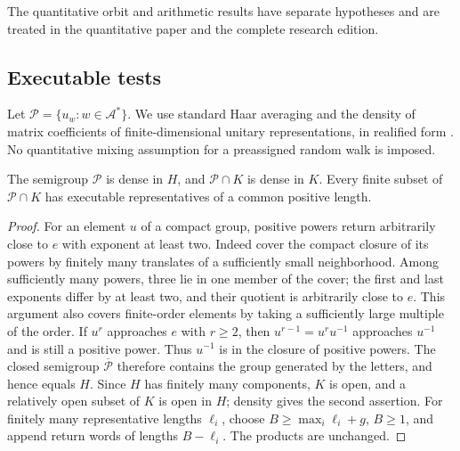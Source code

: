 The quantitative orbit and arithmetic results have separate hypotheses and are treated in the quantitative paper and the complete research edition.

\subsection{Executable tests}
Let $\mathcal P=\{u_w:w\in\mathcal A^*\}$. We use standard Haar averaging and the density of matrix coefficients of finite-dimensional unitary representations, in realified form \cite{Folland}. No quantitative mixing assumption for a preassigned random walk is imposed.

\begin{lemma}\label{lem:positive54}
The semigroup $\mathcal P$ is dense in $H$, and $\mathcal P\cap K$ is dense in $K$. Every finite subset of $\mathcal P\cap K$ has executable representatives of a common positive length.
\end{lemma}
\begin{proof}
For an element $u$ of a compact group, positive powers return arbitrarily close to $e$ with exponent at least two. Indeed cover the compact closure of its powers by finitely many translates of a sufficiently small neighborhood. Among sufficiently many powers, three lie in one member of the cover; the first and last exponents differ by at least two, and their quotient is arbitrarily close to $e$. This argument also covers finite-order elements by taking a sufficiently large multiple of the order. If $u^r$ approaches $e$ with $r\ge2$, then $u^{r-1}=u^ru^{-1}$ approaches $u^{-1}$ and is still a positive power. Thus $u^{-1}$ is in the closure of positive powers. The closed semigroup $\overline{\mathcal P}$ therefore contains the group generated by the letters, and hence equals $H$. Since $H$ has finitely many components, $K$ is open, and a relatively open subset of $K$ is open in $H$; density gives the second assertion. For finitely many representative lengths $\ell_i$, choose $B\ge\max_i\ell_i+g$, $B\ge1$, and append return words of lengths $B-\ell_i$. The products are unchanged.
\end{proof}

